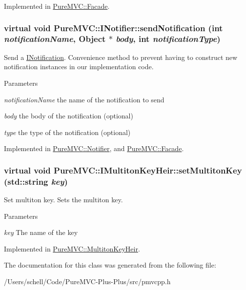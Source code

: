 Implemented in \hyperlink{class_pure_m_v_c_1_1_facade_a6cba094fce77dac303714372a8bb3fc5}{PureMVC::Facade}.\hypertarget{class_pure_m_v_c_1_1_i_notifier_a65e8333ccfea74138b79f84dac96af25}{
\subsubsection[{sendNotification}]{\setlength{\rightskip}{0pt plus 5cm}virtual void PureMVC::INotifier::sendNotification (int {\em notificationName}, \/  {\bf Object} $\ast$ {\em body}, \/  int {\em notificationType})}}
\label{class_pure_m_v_c_1_1_i_notifier_a65e8333ccfea74138b79f84dac96af25}


Send a {\ttfamily \hyperlink{class_pure_m_v_c_1_1_i_notification}{INotification}}. Convenience method to prevent having to construct new notification instances in our implementation code.


\begin{DoxyParams}{Parameters}
\item[{\em notificationName}]the name of the notification to send \item[{\em body}]the body of the notification (optional) \item[{\em type}]the type of the notification (optional) \end{DoxyParams}


Implemented in \hyperlink{class_pure_m_v_c_1_1_notifier_a55a358ee2661ecc08400653016fdb497}{PureMVC::Notifier}, and \hyperlink{class_pure_m_v_c_1_1_facade_a39a61e0a65d0f979848d36fe99cfd5f5}{PureMVC::Facade}.\hypertarget{class_pure_m_v_c_1_1_i_multiton_key_heir_a03acb75ab79defba2c28b8de1bbe1ca6}{
\subsubsection[{setMultitonKey}]{\setlength{\rightskip}{0pt plus 5cm}virtual void PureMVC::IMultitonKeyHeir::setMultitonKey (std::string {\em key})}}
\label{class_pure_m_v_c_1_1_i_multiton_key_heir_a03acb75ab79defba2c28b8de1bbe1ca6}


Set multiton key. Sets the multiton key. 
\begin{DoxyParams}{Parameters}
\item[{\em key}]The name of the key \end{DoxyParams}


Implemented in \hyperlink{class_pure_m_v_c_1_1_multiton_key_heir_abc70ef7c066bc8d7bf0196ec727599bb}{PureMVC::MultitonKeyHeir}.

The documentation for this class was generated from the following file:\begin{DoxyCompactItemize}
\item 
/Users/schell/Code/PureMVC-\/Plus-\/Plus/src/pmvcpp.h\end{DoxyCompactItemize}
